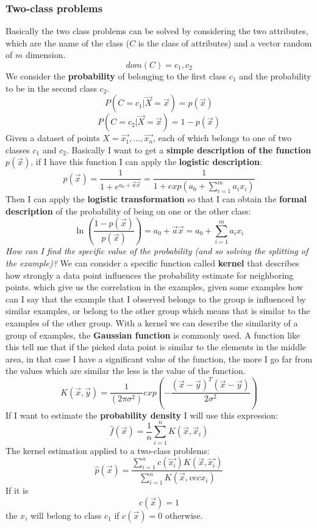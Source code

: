 \documentclass{article}
\begin{document}
\subsubsection{Two-class problems}
Basically the two class problems can be solved by considering the two attributes,
which are the name of the class ($C$ is the class of attributes) and a vector random of $m$ dimension.
$$dom(C)={c_1,c_2}$$
We consider the \textbf{probability} of belonging to the first class $c_1$
and the probability to be in the second class $c_2$.
$$P(C=c_1|\vec{X}=\vec{x})=p(\vec{x})$$
$$P(C=c_2|\vec{X}=\vec{x})=1-p(\vec{x})$$
Given a dataset of points $X={\vec{x_1},...,\vec{x_n}}$, each of which belongs to one
of two classes $c_1$ and $c_2$.
\newline\newline
Basically I want to get a \textbf{simple description of the function} $p(\vec{x})$, if I have
this function I can apply the \textbf{logistic description}:
$$p(\vec{x})=\frac{1}{1+e^{a_0+\vec{a}\vec{x}}}=\frac{1}{1+exp(a_0+\sum_{i=1}^m a_i x_i)}$$
Then I can apply the \textbf{logistic transformation} so that I can obtain the
\textbf{formal description} of the probability of being on one or the other class:
$$\ln{\left(\frac{1-p(\vec{x})}{p(\vec{x})}\right)}=a_0+\vec{a}\vec{x}=a_0+\sum_{i=1}^m a_i x_i$$
\textit{How can I find the specific value of the probability (and so solving the splitting of the
    example)?}
We can consider a specific function called \textbf{kernel} that describes
how strongly a data point influences the probability estimate for neighboring points.
\newline\newline
which give us the correlation
in the examples, given some examples how can I say that the example that I observed
belongs to the group is influenced by similar examples, or belong to the other group
which means that is similar to the examples of the other group.
\newline\newline
With a kernel we can describe the similarity of a
group of examples, the \textbf{Gaussian function} is commonly used. A function like this
tell me that if the picked data point is similar to the elements in the middle area, in that
case I have a significant value of the function, the more I go far from the values
which are similar the less is the value of the function.
$$K(\vec{x},\vec{y})=\frac{1}{(2\pi\sigma^2)}exp\left(-\frac{(\vec{x}-\vec{y})^T(\vec{x}-\vec{y})}{2\sigma^2}\right)$$
If I want to estimate the \textbf{probability density} I will use this expression:
$$\hat{f} (\vec{x}) = \frac{1}{n} \sum_{i=1}^n K(\vec{x},\vec{x}_i)$$
The kernel estimation applied to a two-class problems:
$$\hat{p}(\vec{x})=\frac{\sum_{i=1}^n c(\vec{x_i})K(\vec{x},\vec{x_i})}{\sum_{i=1}^n K(\vec{x},vec{x_i})}$$
If it is $$c(\vec{x})=1$$ the $x_i$ will belong to class $c_1$ if $c(\vec{x})=0$ otherwise.
\end{document}
